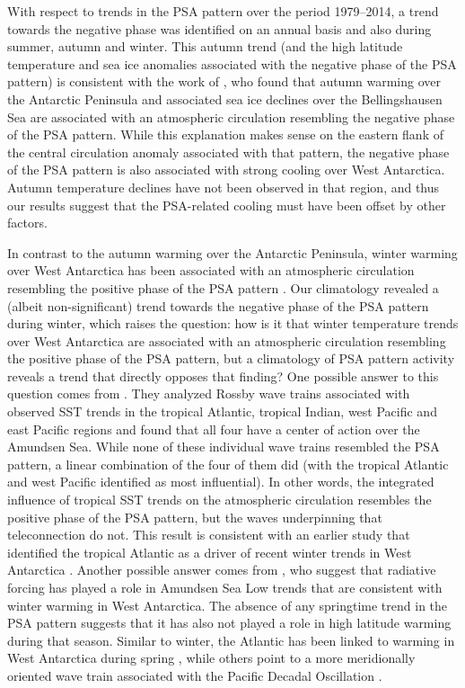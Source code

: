 With respect to trends in the PSA pattern over the period 1979--2014, a trend towards the negative phase was identified on an annual basis and also during summer, autumn and winter. This autumn trend (and the high latitude temperature and sea ice anomalies associated with the negative phase of the PSA pattern) is consistent with the work of \citet{Ding2013}, who found that autumn warming over the Antarctic Peninsula and associated sea ice declines over the Bellingshausen Sea are associated with an atmospheric circulation resembling the negative phase of the PSA pattern. While this explanation makes sense on the eastern flank of the central circulation anomaly associated with that pattern, the negative phase of the PSA pattern is also associated with strong cooling over West Antarctica. Autumn temperature declines have not been observed in that region, and thus our results suggest that the PSA-related cooling must have been offset by other factors. 

In contrast to the autumn warming over the Antarctic Peninsula, winter warming over West Antarctica has been associated with an atmospheric circulation resembling the positive phase of the PSA pattern \citep{Ding2011}. Our climatology revealed a (albeit non-significant) trend towards the negative phase of the PSA pattern during winter, which raises the question: how is it that winter temperature trends over West Antarctica are associated with an atmospheric circulation resembling the positive phase of the PSA pattern, but a climatology of PSA pattern activity reveals a trend that directly opposes that finding? One possible answer to this question comes from \citet{Li2015a}. They analyzed Rossby wave trains associated with observed SST trends in the tropical Atlantic, tropical Indian, west Pacific and east Pacific regions and found that all four have a center of action over the Amundsen Sea. While none of these individual wave trains resembled the PSA pattern, a linear combination of the four of them did (with the tropical Atlantic and west Pacific identified as most influential). In other words, the integrated influence of tropical SST trends on the atmospheric circulation resembles the positive phase of the PSA pattern, but the waves underpinning that teleconnection do not. This result is consistent with an earlier study that identified the tropical Atlantic as a driver of recent winter trends in West Antarctica \citep{Li2014}. Another possible answer comes from \citet{Fogt2015}, who suggest that radiative forcing has played a role in Amundsen Sea Low trends that are consistent with winter warming in West Antarctica. The absence of any springtime trend in the PSA pattern suggests that it has also not played a role in high latitude warming during that season. Similar to winter, the Atlantic has been linked to warming in West Antarctica during spring \citep{Simpkins2014}, while others point to a more meridionally oriented wave train associated with the Pacific Decadal Oscillation \citep[PDO;][]{Clem2015,Clem2015a}. 

